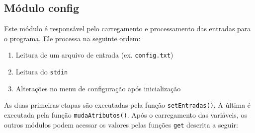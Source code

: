 \documentclass[11pt,a4paper]{article}
\begin{document}
\subsection{Módulo config}
Este módulo é responsável pelo carregamento e processamento das entradas para o programa. Ele processa na seguinte ordem:
\begin{enumerate}
\item Leitura de um arquivo de entrada (ex. \verb|config.txt|)
\item Leitura do \texttt{stdin}
\item Alterações no menu de configuração após inicialização
\end{enumerate}

As duas primeiras etapas são executadas pela função \verb|setEntradas()|. A última é executada pela função \verb|mudaAtributos()|. Após o carregamento das variáveis, os outros módulos podem acessar os valores pelas funções \texttt{get} descrita a seguir:\\
\end{document}
